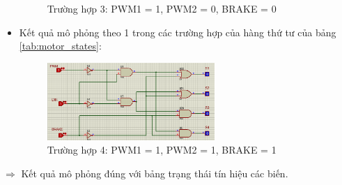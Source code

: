 \begin{itemize}
\begin{figure}[H]
                    \caption{Trường hợp 3: PWM1 = 1, PWM2 = 0, BRAKE = 0}
                \end{figure}
            \item Kết quả mô phỏng theo 1 trong các trường hợp của hàng thứ tư của bảng \ref{tab:motor_states}:
                \begin{figure}[H]
                    \centering
                    \includegraphics[width=0.6\textwidth]{pictures/3_result4.png}
                    \caption{Trường hợp 4: PWM1 = 1, PWM2 = 1, BRAKE = 1}
                \end{figure}
        \end{itemize}
        $\Rightarrow$ Kết quả mô phỏng đúng với bảng trạng thái tín hiệu các biến.
        
    
       